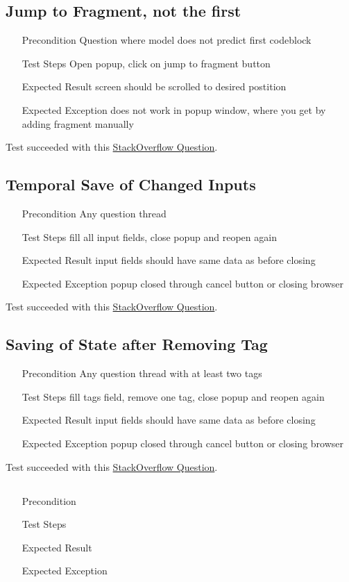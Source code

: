\documentclass{report}
\begin{document}
\subsection*{Jump to Fragment, not the first}
\begin{itemize}
	\item[Precondition] Question where model does not predict first codeblock
	\item[Test Steps] Open popup, click on jump to fragment button
	\item[Expected Result] screen should be scrolled to desired postition
	\item[Expected Exception] does not work in popup window, where you get by adding fragment manually
\end{itemize}
Test succeeded with this \href{https://stackoverflow.com/questions/221294/how-do-you-get-a-timestamp-in-javascript?rq=1}{StackOverflow Question}.

\subsection*{Temporal Save of Changed Inputs}
\begin{itemize}
	\item[Precondition] Any question thread
	\item[Test Steps] fill all input fields, close popup and reopen again
	\item[Expected Result] input fields should have same data as before closing
	\item[Expected Exception] popup closed through cancel button or closing browser
\end{itemize}
Test succeeded with this \href{https://stackoverflow.com/questions/221294/how-do-you-get-a-timestamp-in-javascript?rq=1}{StackOverflow Question}.


\subsection*{Saving of State after Removing Tag}
\begin{itemize}
	\item[Precondition] Any question thread with at least two tags
	\item[Test Steps] fill tags field, remove one tag, close popup and reopen again
	\item[Expected Result] input fields should have same data as before closing
	\item[Expected Exception] popup closed through cancel button or closing browser
\end{itemize}
Test succeeded with this \href{https://stackoverflow.com/questions/221294/how-do-you-get-a-timestamp-in-javascript?rq=1}{StackOverflow Question}.

\subsection*{}
\begin{itemize}
	\item[Precondition]
	\item[Test Steps]
	\item[Expected Result]
	\item[Expected Exception]
\end{itemize}
\end{document}
